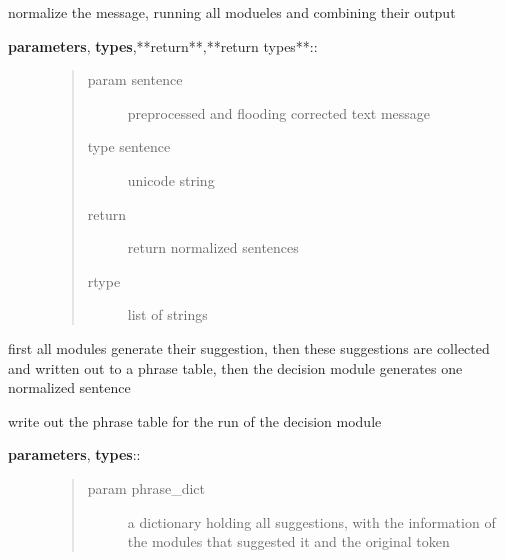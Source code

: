 \documentclass[letterpaper,10pt,english]{sphinxmanual}
\begin{document}
\begin{fulllineitems}
\begin{fulllineitems}
\label{API:norm.normalizer.Normalizer._normalize_sentence}
normalize the message, running all modueles and combining their output
\begin{description}
\item[{\textbf{parameters}, \textbf{types},**return**,**return types**::}] \leavevmode\begin{quote}\begin{description}
\item[{param sentence}] \leavevmode
preprocessed and flooding corrected text message

\item[{type sentence}] \leavevmode
unicode string

\item[{return}] \leavevmode
return normalized sentences

\item[{rtype}] \leavevmode
list of strings

\end{description}\end{quote}

\end{description}

first all modules generate their suggestion, then these suggestions are collected
and written out to a phrase table, then the decision module generates one normalized            sentence

\end{fulllineitems}


\begin{fulllineitems}
\label{API:norm.normalizer.Normalizer._write_phrase_table}
write out the phrase table for the run of the decision module
\begin{description}
\item[{\textbf{parameters}, \textbf{types}::}] \leavevmode\begin{quote}\begin{description}
\item[{param phrase\_dict}] \leavevmode
a dictionary holding all suggestions, with the information of the modules that suggested it and the original token


\end{description}
\end{quote}
\end{description}
\end{fulllineitems}
\end{fulllineitems}
\end{document}
